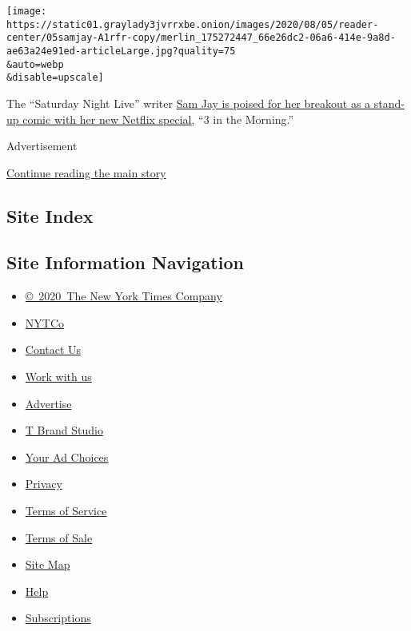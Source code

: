\texttt{[image: https://static01.graylady3jvrrxbe.onion/images/2020/08/05/reader-center/05samjay-A1rfr-copy/merlin\_175272447\_66e26dc2-06a6-414e-9a8d-ae63a24e91ed-articleLarge.jpg?quality=75\\\&auto=webp\\\&disable=upscale]}

The ``Saturday Night Live'' writer
\href{https://www.nytimes3xbfgragh.onion/2020/08/04/arts/television/sam-jay-netflix-special.html}{Sam
Jay is poised for her breakout as a stand-up comic with her new Netflix
special}, ``3 in the Morning.''

Advertisement

\protect\hyperlink{after-bottom}{Continue reading the main story}

\hypertarget{site-index}{%
\subsection{Site Index}\label{site-index}}

\hypertarget{site-information-navigation}{%
\subsection{Site Information
Navigation}\label{site-information-navigation}}

\begin{itemize}
\tightlist
\item
  \href{https://help.nytimes3xbfgragh.onion/hc/en-us/articles/115014792127-Copyright-notice}{©~2020~The
  New York Times Company}
\end{itemize}

\begin{itemize}
\tightlist
\item
  \href{https://www.nytco.com/}{NYTCo}
\item
  \href{https://help.nytimes3xbfgragh.onion/hc/en-us/articles/115015385887-Contact-Us}{Contact
  Us}
\item
  \href{https://www.nytco.com/careers/}{Work with us}
\item
  \href{https://nytmediakit.com/}{Advertise}
\item
  \href{http://www.tbrandstudio.com/}{T Brand Studio}
\item
  \href{https://www.nytimes3xbfgragh.onion/privacy/cookie-policy\#how-do-i-manage-trackers}{Your
  Ad Choices}
\item
  \href{https://www.nytimes3xbfgragh.onion/privacy}{Privacy}
\item
  \href{https://help.nytimes3xbfgragh.onion/hc/en-us/articles/115014893428-Terms-of-service}{Terms
  of Service}
\item
  \href{https://help.nytimes3xbfgragh.onion/hc/en-us/articles/115014893968-Terms-of-sale}{Terms
  of Sale}
\item
  \href{https://spiderbites.nytimes3xbfgragh.onion}{Site Map}
\item
  \href{https://help.nytimes3xbfgragh.onion/hc/en-us}{Help}
\item
  \href{https://www.nytimes3xbfgragh.onion/subscription?campaignId=37WXW}{Subscriptions}
\end{itemize}
